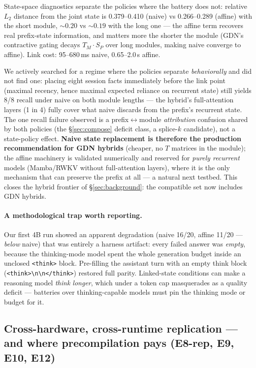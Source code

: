 \documentclass[11pt]{article}
\newcommand{\code}[1]{\texttt{#1}}
\begin{document}
State-space diagnostics separate the policies where the battery does not: relative $L_2$ distance from the joint state is 0.379--0.410 (naive) vs 0.266--0.289 (affine) with the short module, ${\sim}0.20$ vs ${\sim}0.19$ with the long one --- the affine term recovers real prefix-state information, and matters more the shorter the module (GDN's contractive gating decays $T_M \cdot S_P$ over long modules, making naive converge to affine). Link cost: 95--680\,ms naive, 0.65--2.0\,s affine.

We actively searched for a regime where the policies separate \emph{behaviorally} and did not find one: placing eight session facts immediately before the link point (maximal recency, hence maximal expected reliance on recurrent state) still yields 8/8 recall under naive on both module lengths --- the hybrid's full-attention layers (1 in 4) fully cover what naive discards from the prefix's recurrent state. The one recall failure observed is a prefix$\leftrightarrow$module \emph{attribution} confusion shared by both policies (the \S\ref{sec:compose} deficit class, a splice-$k$ candidate), not a state-policy effect. \textbf{Naive state replacement is therefore the production recommendation for GDN hybrids} (cheaper, no $T$ matrices in the module); the affine machinery is validated numerically and reserved for \emph{purely recurrent} models (Mamba/RWKV without full-attention layers), where it is the only mechanism that can preserve the prefix at all --- a natural next testbed. This closes the hybrid frontier of \S\ref{sec:background}: the compatible set now includes GDN hybrids.

\paragraph{A methodological trap worth reporting.}
Our first 4B run showed an apparent degradation (naive 16/20, affine 11/20 --- \emph{below} naive) that was entirely a harness artifact: every failed answer was \emph{empty}, because the thinking-mode model spent the whole generation budget inside an unclosed \code{<think>} block. Pre-filling the assistant turn with an empty think block (\code{<think>\textbackslash n\textbackslash n</think>}) restored full parity. Linked-state conditions can make a reasoning model \emph{think longer}, which under a token cap masquerades as a quality deficit --- batteries over thinking-capable models must pin the thinking mode or budget for it.

\subsection{Cross-hardware, cross-runtime replication --- and where precompilation pays (E8-rep, E9, E10, E12)}
\label{sec:regimes}
\end{document}

